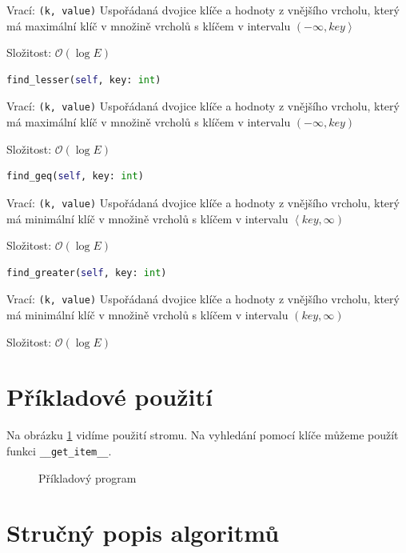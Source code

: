 \documentclass[a4paper,11pt,openany]{article}
\begin{document}
Vrací: \texttt{(k, value)} Uspořádaná dvojice klíče a hodnoty z vnějšího vrcholu, který má maximální klíč v množině vrcholů s klíčem v intervalu $\left( -\infty, key\right\rangle $
	
Složitost: $\mathcal{O}(\log E)$
	
\begin{lstlisting}[language=python,frame=none]
find_lesser(self, key: int)
\end{lstlisting}
	
Vrací: \texttt{(k, value)} Uspořádaná dvojice klíče a hodnoty z vnějšího vrcholu, který má maximální klíč v množině vrcholů s klíčem v intervalu $\left( -\infty, key\right) $
	
Složitost: $\mathcal{O}(\log E)$
	
\begin{lstlisting}[language=python,frame=none]
find_geq(self, key: int)
\end{lstlisting}
	
Vrací: \texttt{(k, value)} Uspořádaná dvojice klíče a hodnoty z vnějšího vrcholu, který má minimální klíč v množině vrcholů s klíčem v intervalu $\left\langle key, \infty \right) $
	
Složitost: $\mathcal{O}(\log E)$
	
\begin{lstlisting}[language=python,frame=none]
find_greater(self, key: int)
\end{lstlisting}
	
Vrací: \texttt{(k, value)} Uspořádaná dvojice klíče a hodnoty z vnějšího vrcholu, který má minimální klíč v množině vrcholů s klíčem v intervalu $\left( key, \infty \right) $
	
Složitost: $\mathcal{O}(\log E)$

\section{Příkladové použití}
Na obrázku \ref{code} vidíme použití stromu. Na vyhledání pomocí klíče můžeme použít funkci \texttt{\_\_get\_item\_\_}.
\begin{figure}[h]

\caption{Příkladový program}
\label{code}
\end{figure}

\section{Stručný popis algoritmů}
	
\end{document}

